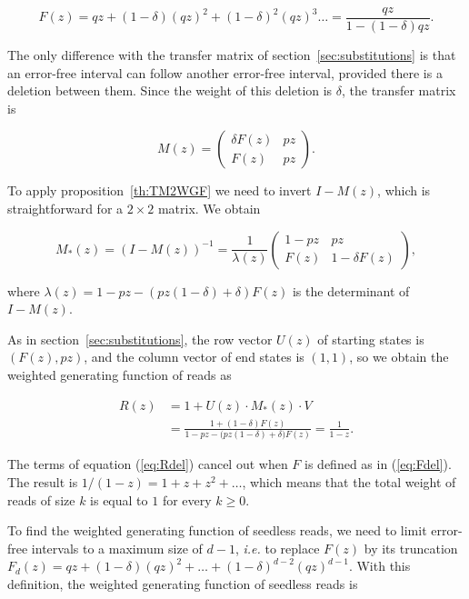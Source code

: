 \documentclass{article}
\begin{document}
\begin{equation}
\label{eq:Fdel}
F(z) = qz + (1-\delta)(qz)^2 + (1-\delta)^2(qz)^3 \ldots =
\frac{qz}{1-(1-\delta)qz}.
\end{equation}

The only difference with the transfer matrix of
section~\ref{sec:substitutions} is that an error-free interval can follow
another error-free interval, provided there is a deletion between them.
Since the weight of this deletion is $\delta$, the transfer matrix is

\begin{equation*}
M(z) = \left(
\begin{matrix}
\delta F(z) & pz \\
F(z)        & pz
\end{matrix}
\right).
\end{equation*}

To apply proposition~\ref{th:TM2WGF} we need to invert $I-M(z)$, which is
straightforward for a $2 \times 2$ matrix. We obtain

\begin{equation*}
M_*(z) = (I-M(z))^{-1}=
\frac{1}{\lambda(z)}
\left(
\begin{matrix}
1-pz  & pz              \\
F(z) & 1 -\delta F(z)
\end{matrix}
\right),
\end{equation*}

\noindent
where $\lambda(z) = 1-pz-(pz(1-\delta)+\delta)F(z)$ is the determinant of
$I-M(z)$.

As in section~\ref{sec:substitutions}, the row vector $U(z)$ of starting
states is $(F(z), pz)$, and the column vector of end states is $(1,1)$, so
we obtain the weighted generating function of reads as

\begin{equation}
\label{eq:Rdel}
\begin{split}
R(z) &= 1 + U(z) \cdot M_*(z) \cdot V \\
&= \frac{1+(1-\delta)F(z)} {1-pz - \big(pz(1-\delta) + \delta\big)F(z)}
= \frac{1}{1-z}.
\end{split}
\end{equation}

The terms of equation (\ref{eq:Rdel}) cancel out when $F$ is defined as in
(\ref{eq:Fdel}). The result is $1/(1-z) = 1+z +z^2 + \ldots$, which means
that the total weight of reads of size $k$ is equal to $1$ for every $k
\geq 0$.

To find the weighted generating function of seedless reads, we need to
limit error-free intervals to a maximum size of $d-1$, \textit{i.e.} to
replace $F(z)$ by its truncation $F_d(z) = qz + (1-\delta)(qz)^2 + \ldots
+ (1-\delta)^{d-2}(qz)^{d-1}$. With this definition, the weighted
generating function of seedless reads is
\end{document}
